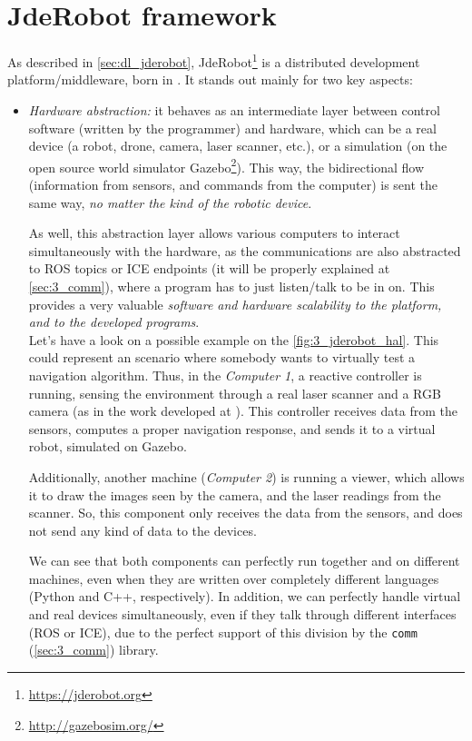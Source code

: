 \section{JdeRobot framework}
	As described in \autoref{sec:dl_jderobot}, JdeRobot\footnote{\url{https://jderobot.org}} is a distributed development platform/middleware, born in \cite{jmplaza-phd}. It stands out mainly for two key aspects:
	\begin{itemize}
		\item \textit{Hardware abstraction:} it behaves as an intermediate layer between control software (written by the programmer) and hardware, which can be a real device (a robot, drone, camera, laser scanner, etc.), or a simulation (on the open source world simulator Gazebo\footnote{\url{http://gazebosim.org/}}). This way, the bidirectional flow (information from sensors, and commands from the computer) is sent the same way, \textit{no matter the kind of the robotic device}.
		
		As well, this abstraction layer allows various computers to interact simultaneously with the hardware, as the communications are also abstracted to ROS topics or ICE endpoints (it will be properly explained at \autoref{sec:3_comm}), where a program has to just listen/talk to be in on. This provides a very valuable \textit{software and hardware scalability to the platform, and to the developed programs}.\\
		
		Let's have a look on a possible example on the \autoref{fig:3_jderobot_hal}. This could represent an scenario where somebody wants to virtually test a navigation algorithm. Thus, in the \emph{Computer 1}, a reactive controller is running, sensing the environment through a real laser scanner and a RGB camera (as in the work developed at \cite{rocapal}). This controller receives data from the sensors, computes a proper navigation response, and sends it to a virtual robot, simulated on Gazebo.
		
		Additionally, another machine (\emph{Computer 2}) is running a viewer, which allows it to draw the images seen by the camera, and the laser readings from the scanner. So, this component only receives the data from the sensors, and does not send any kind of data to the devices.
		
		We can see that both components can perfectly run together and on different machines, even when they are written over completely different languages (Python and C++, respectively). In addition, we can perfectly handle virtual and real devices simultaneously, even if they talk through different interfaces (ROS or ICE), due to the perfect support of this division by the \texttt{comm} (\autoref{sec:3_comm}) library.\\
		

\end{itemize}
